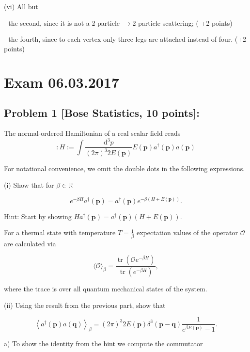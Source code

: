 \documentclass[10pt, letterpaper]{article}
\begin{document}
(vi) All but

- the second, since it is not a 2 particle $\rightarrow 2$ particle scattering; ( +2 points)

- the fourth, since to each vertex only three legs are attached instead of four. (+2 points)


\pagebreak



\section{Exam 06.03.2017}


\subsection{Problem 1 [Bose Statistics, 10 points]:}

The normal-ordered Hamiltonian of a real scalar field reads
$$
: H:=\int \frac{\mathrm{d}^3 p}{(2 \pi)^3 2 E(\mathbf{p})} E(\mathbf{p}) a^{\dagger}(\mathbf{p}) a(\mathbf{p})
$$

For notational convenience, we omit the double dots in the following expressions.

(i) Show that for $\beta \in \mathbb{R}$

$$
e^{-\beta H} a^{\dagger}(\mathbf{p})=a^{\dagger}(\mathbf{p}) e^{-\beta(H+E(\mathbf{p}))} .
$$


Hint: Start by showing $H a^{\dagger}(\mathbf{p})=a^{\dagger}(\mathbf{p})(H+E(\mathbf{p}))$.

For a thermal state with temperature $T=\frac{1}{\beta}$ expectation values of the operator $\mathcal{O}$ are calculated via

$$
\langle\mathcal{O}\rangle_\beta=\frac{\operatorname{tr}\left(\mathcal{O} e^{-\beta H}\right)}{\operatorname{tr}\left(e^{-\beta H}\right)},
$$

where the trace is over all quantum mechanical states of the system.

(ii) Using the result from the previous part, show that

$$
\left\langle a^{\dagger}(\mathbf{p}) a(\mathbf{q})\right\rangle_\beta=(2 \pi)^3 2 E(\mathbf{p}) \delta^3(\mathbf{p}-\mathbf{q}) \frac{1}{e^{\beta E(\mathbf{p})}-1} .
$$


a) To show the identity from the hint we compute the commutator
\end{document}
